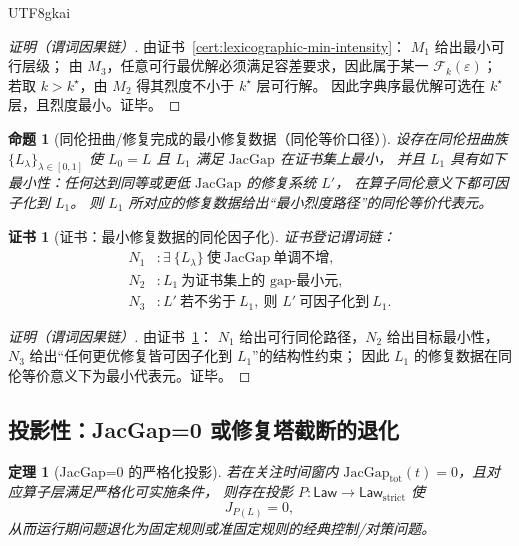 \documentclass[12pt]{article}
\newtheorem{theorem}{定理}[section]
\newtheorem{proposition}{命题}[section]
\newtheorem{Certificate}{证书}[section]
\newcommand{\JacGap}{\ensuremath{\mathrm{JacGap}}} %
\begin{document}
\begin{CJK*}{UTF8}{gkai}
\begin{proof}[证明（谓词因果链）]
由证书~\ref{cert:lexicographic-min-intensity}：
$M_1$ 给出最小可行层级；
由 $M_3$，任意可行最优解必须满足容差要求，因此属于某一 $\mathcal{F}_k(\varepsilon)$；
若取 $k>k^\star$，由 $M_2$ 得其烈度不小于 $k^\star$ 层可行解。
因此字典序最优解可选在 $k^\star$ 层，且烈度最小。证毕。
\end{proof}

\begin{proposition}[同伦扭曲/修复完成的最小修复数据（同伦等价口径）]
\label{prop:homotopy-twist-min-repair}
设存在同伦扭曲族 $\{L_\lambda\}_{\lambda\in[0,1]}$ 使 $L_0=L$ 且 $L_1$ 满足 $\JacGap$ 在证书集上最小，
并且 $L_1$ 具有如下最小性：任何达到同等或更低 $\JacGap$ 的修复系统 $L'$，
在算子同伦意义下都可因子化到 $L_1$。
则 $L_1$ 所对应的修复数据给出“最小烈度路径”的同伦等价代表元。
\end{proposition}

\begin{Certificate}[证书：最小修复数据的同伦因子化]
\label{cert:homotopy-twist-min-repair}
证书登记谓词链：
\[
\begin{aligned}
  N_1 &: \exists\ \{L_\lambda\}\ \text{使}\ \JacGap\ \text{单调不增},\\
  N_2 &: L_1\ \text{为证书集上的 gap-最小元},\\
  N_3 &: L'\ \text{若不劣于}\ L_1,\ \text{则 }L'\ \text{可因子化到}\ L_1.
\end{aligned}
\]
\end{Certificate}

\begin{proof}[证明（谓词因果链）]
由证书~\ref{cert:homotopy-twist-min-repair}：
$N_1$ 给出可行同伦路径，$N_2$ 给出目标最小性，
$N_3$ 给出“任何更优修复皆可因子化到 $L_1$”的结构性约束；
因此 $L_1$ 的修复数据在同伦等价意义下为最小代表元。证毕。
\end{proof}

\subsection{投影性：JacGap=0 或修复塔截断的退化}
\label{sec:open-system-projection}

\begin{theorem}[JacGap=0 的严格化投影]
\label{thm:jacgap-zero-strictification}
若在关注时间窗内 $\JacGap_{\mathrm{tot}}(t)=0$，且对应算子层满足严格化可实施条件，
则存在投影 $P:\mathsf{Law}\to\mathsf{Law}_{\mathrm{strict}}$ 使
\[
  J_{P(L)}=0,
\]
从而运行期问题退化为固定规则或准固定规则的经典控制/对策问题。
\end{theorem}


\end{CJK*}
\end{document}
